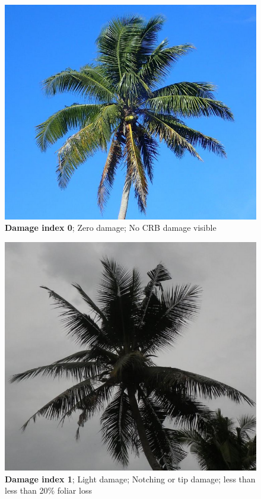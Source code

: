 \documentclass[twocolumn,letterpaper]{scrartcl}
\begin{document}
\begin{figure}[p]
	\centering
	\includegraphics[width=.8\linewidth]{images/j5index0.resized.png}
	\caption{\textbf{Damage index 0}; Zero damage; No CRB damage visible}
	\label{fig:damage0}
\end{figure}

\begin{figure}[p]
	\centering
	\includegraphics[width=.8\linewidth]{images/j5index1.resized.png}
	\caption{\textbf{Damage index 1}; Light damage; Notching or tip damage; less than less than 20\% foliar loss}
	\label{fig:damage1}
\end{figure}
\end{document}
